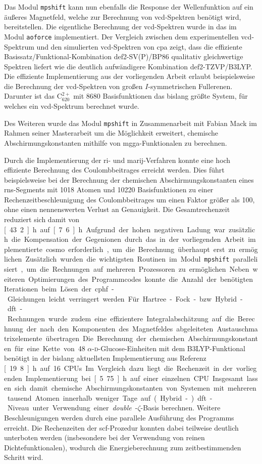 Das Modul \texttt{mpshift} kann nun ebenfalls die Response der Wellenfunktion auf ein äußeres Magnetfeld, welche zur Berechnung von \ac{vcd}-Spektren benötigt wird, bereitstellen. Die eigentliche Berechnung der \ac{vcd}-Spektren wurde in das im Modul \texttt{aoforce} implementiert. Der Vergleich zwischen dem experimentellen \ac{vcd}-Spektrum und den simulierten \ac{vcd}-Spektren von \acl{cpa} zeigt, dass die effiziente Basissatz/Funktional-Kombination def2-SV(P)/BP86 qualitativ gleichwertige Spektren liefert wie die deutlich aufwändigere Kombination def2-TZVP/B3LYP. Die effiziente Implementierung aus der vorliegenden Arbeit erlaubt beispielsweise die Berechnung der \ac{vcd}-Spektren von großen $I$-symmetrischen Fullerenen. Darunter ist das C$_{620}^{2+}$ mit 8680 Basisfunktionen das bislang größte System, für welches ein \ac{vcd}-Spektrum berechnet wurde.

Des Weiteren wurde das Modul \texttt{mpshift} in Zusammenarbeit mit Fabian Mack im Rahmen seiner Masterarbeit um die Möglichkeit erweitert, chemische Abschirmungskonstanten mithilfe von \ac{mgga}-Funktionalen zu berechnen. 

\bigskip
Durch die Implementierung der \ac{ri}- und \ac{marij}-Verfahren konnte eine hoch effiziente Berechnung des Coulombbeitrages erreicht werden. Dies führt beispielsweise bei der Berechnung der chemischen Abschirmungskonstanten eines \ac{rns}-Segments mit 1018 Atomen und 10220 Basisfunktionen zu einer Rechenzeitbeschleunigung des Coulombbeitrages um einen Faktor größer als 100, ohne einen nennenswerten Verlust an Genauigkeit. Die Gesamtrechenzeit reduziert sich damit von \unit[43.2]{h} auf \unit[7.6]{h}. Aufgrund der hohen negativen Ladung war zusätzlich die Kompensation der Gegenionen durch das in der vorliegenden Arbeit implementierte \ac{cosmo} erforderlich, um die Berechnung überhaupt erst zu ermöglichen. Zusätzlich wurden die wichtigsten Routinen im Modul \texttt{mpshift} parallelisiert, um die Rechnungen auf mehreren Prozessoren zu ermöglichen. Neben weiteren Optimierungen des Programmcodes konnte die Anzahl der benötigten Iterationen beim Lösen der \ac{cphf}-Gleichungen leicht verringert werden. Für Hartree-Fock- bzw. Hybrid-\ac{dft}-Rechnungen wurde zudem eine effizientere Integralabschätzung auf die Berechnung der nach den Komponenten des Magnetfeldes abgeleiteten Austauschmatrixelemente übertragen. Die Berechnung der chemischen Abschirmungskonstanten für eine Kette von 48 $\alpha$-\textsc{d}-Glucose-Einheiten mit dem B3LYP-Funktional benötigt in der bislang aktuellsten Implementierung aus Referenz \cite{kumar2016nuclei} \unit[19.8]{h} auf 16 CPUs. Im Vergleich dazu liegt die Rechenzeit in der vorliegenden Implementierung bei \unit[5.75]{h} auf einer einzelnen CPU. Insgesamt lassen sich damit chemische Abschirmungskonstanten von Systemen mit mehreren tausend Atomen innerhalb weniger Tage auf (Hybrid-)\ac{dft}-Niveau unter Verwendung einer \textit{double}-$\zeta$-Basis berechnen. Weitere Beschleunigungen werden durch eine parallele Ausführung des Programms erreicht. Die Rechenzeiten der \ac{scf}-Prozedur konnten dabei teilweise deutlich unterboten werden (insbesondere bei der Verwendung von reinen Dichtefunktionalen), wodurch die Energieberechnung zum zeitbestimmenden Schritt wird.

